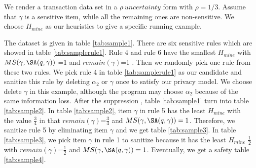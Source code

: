 %

We render a transaction data set in a $\rho~uncertainty$ form with $\rho=1/3$. Assume that $\gamma$ is a sensitive item, while all the remaining
ones are non-sensitive. We choose $H_{mine}$ as our heuristics to give a specific running example.

The dataset is given in table \ref{tab:sample1}.
 There are six sensitive rules which are showed in table \ref{tab:samplerule1}.
Rule 4
and rule 6 have the smallest $H_{mine}$ with $MS(\gamma, \SA(q,\gamma))$ =1 and $remain(\gamma)$=1 . Then we randomly pick one rule from these two rules. We pick rule 4
in table \ref{tab:samplerule1} as our candidate and
sanitize this rule by deleting  $\alpha_{2}$ or $\gamma$ once to satisfy our privacy model. We choose delete $\gamma$ in this example, although the program may choose $\alpha_{2}$
because of the same information loss.
After the suppression , table \ref{tab:sample1} turn into table \ref{tab:sample2}. In table
\ref{tab:sample2}, item $\gamma$ in rule 5 has the least $H_{mine}$ with the value $\frac{3}{4}$ in that $remain(\gamma)$=$\frac{3}{4}$ and $MS(\gamma, \SA(q,\gamma))=1$. Therefore, we sanitize rule 5
by eliminating item $\gamma$ and we get table \ref{tab:sample3}. In table \ref{tab:sample3}, we pick item $\gamma$ in rule 1 to sanitize because it has the least
$H_{mine}$ $\frac{1}{2}$ with  $remain(\gamma)$=$\frac{1}{2}$ and $MS(\gamma, \SA(q,\gamma))=1$. Eventually, we get a safety table \ref{tab:sample4}.



